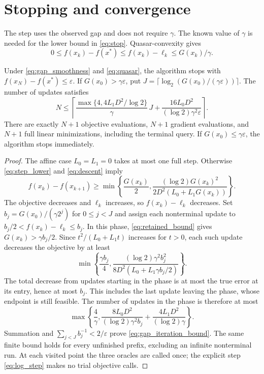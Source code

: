 \section{Stopping and convergence}
\label{sec:rates}
The step uses the observed gap and does not require $\gamma$.
The known value of $\gamma$ is needed for the lower bound in
\eqref{eq:stop}. Quasar-convexity gives
\begin{equation}\label{eq:retained_bound}
 0\le f(x_k)-f(x^*)\le f(x_k)-\ell_k\le G(x_k)/\gamma.
\end{equation}

\begin{theorem}\label{thm:gap_stopping}
Under \eqref{eq:gap_smoothness} and \eqref{eq:quasar}, the algorithm
stops with $f(x_N)-f(x^*)\le\varepsilon$.
If $G(x_0)>\gamma\varepsilon$, put
$J=\lceil\log_2(G(x_0)/(\gamma\varepsilon))\rceil$.
The number of updates satisfies
\begin{equation}\label{eq:gap_iteration_bound}
 N\le\left\lceil
 \frac{\max\{4,4L_1D^2/\log 2\}}{\gamma}\,J
 +\frac{16L_0D^2}{(\log 2)\gamma^2\varepsilon}
 \right\rceil.
\end{equation}
There are exactly $N+1$ objective evaluations, $N+1$ gradient
evaluations, and $N+1$ full linear minimizations, including the terminal
query. If $G(x_0)\le\gamma\varepsilon$, the algorithm stops immediately.
\end{theorem}
\begin{proof}
The affine case $L_0=L_1=0$ takes at most one full step.
Otherwise \eqref{eq:step_lower} and \eqref{eq:descent} imply
\begin{equation}\label{eq:gap_progress}
 f(x_k)-f(x_{k+1})\ge
 \min\left\{\frac{G(x_k)}2,
 \frac{(\log 2)G(x_k)^2}{2D^2(L_0+L_1G(x_k))}\right\}.
\end{equation}
The objective decreases and $\ell_k$ increases, so $f(x_k)-\ell_k$
decreases. Set $b_j=G(x_0)/(\gamma2^j)$ for $0\le j<J$ and assign
each nonterminal update to $b_j/2<f(x_k)-\ell_k\le b_j$.
In this phase, \eqref{eq:retained_bound} gives $G(x_k)>\gamma b_j/2$.
Since $t^2/(L_0+L_1t)$ increases for $t>0$, each such update decreases
the objective by at least
\[
 \min\left\{\frac{\gamma b_j}{4},
 \frac{(\log 2)\gamma^2b_j^2}{8D^2(L_0+L_1\gamma b_j/2)}\right\}.
\]
The total decrease from updates starting in the phase is at most the
true error at its entry, hence at most $b_j$. This includes the last
update leaving the phase, whose endpoint is still feasible.
The number of updates in the phase is therefore at most
\[
 \max\left\{\frac4\gamma,
 \frac{8L_0D^2}{(\log 2)\gamma^2b_j}
 +\frac{4L_1D^2}{(\log 2)\gamma}\right\}.
\]
Summation and $\sum_{j<J}b_j^{-1}<2/\varepsilon$ prove
\eqref{eq:gap_iteration_bound}. The same finite bound holds for every
unfinished prefix, excluding an infinite nonterminal run.
At each visited point the three oracles are called once; the explicit
step \eqref{eq:log_step} makes no trial objective calls.
\end{proof}

